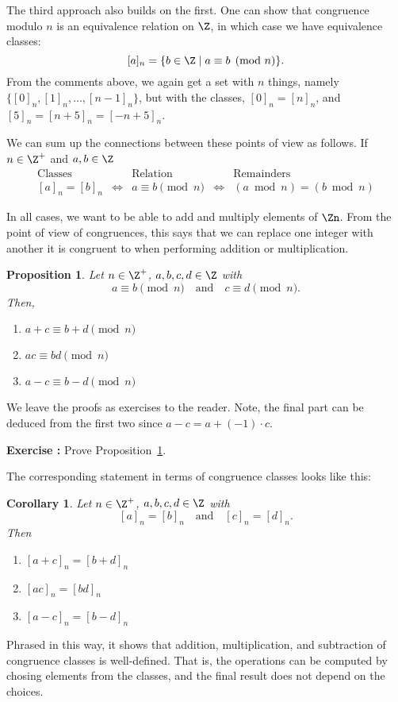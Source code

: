 \documentclass[12pt]{amsart}
\newcounter{probs}
\newenvironment{prob}{%
  \refstepcounter{probs}
  \par\medskip\noindent\textbf{Exercise \theprobs:} }{\par\medskip}
\theoremstyle{plain}
\newtheorem{prop}[thm]{Proposition}
\newtheorem{cor}[thm]{Corollary}
\theoremstyle{definition}
\theoremstyle{remark}
\begin{document}
The third approach also builds on the first.  One can show that
congruence modulo $n$ is an equivalence relation on $\Z$, in which
case we have equivalence classes:
\[ [a]_n = \{b\in\Z\mid a\equiv b\pmod n\}.\]
From the comments above, we again get a set with $n$ things, namely
$\{[0]_n, [1]_n, \ldots, [n-1]_n\}$, but with the classes, $[0]_n=[n]_n$, and
$[5]_n=[n+5]_n=[-n+5]_n$.

We can sum up the connections between these points of view as
follows.  If $n\in\Z^+$ and $a,b\in \Z$
\[
\begin{array}{ccccc}
\text{Classes} && \text{Relation} && \text{Remainders} \\[1ex]
[a]_n=[b]_n & \iff & a\equiv b\pmod n & \iff & (a\bmod n) = (b \bmod n)
\end{array}
\]

In all cases, we want to be able to add and multiply elements of
$\Zn$.  From the point of view of congruences, this says that we can
replace one integer with another it is congruent to when performing
addition or multiplication.
\begin{prop}\label{cong-well-def}
  Let $n\in\Z^+$, $a,b,c,d\in \Z$ with 
  \[ a\equiv b \pmod n \quad\text{and}\quad c\equiv d\pmod n.\]
  Then,
  \begin{enumerate}
  \item $a+c\equiv b+d\pmod n$
  \item $ac\equiv bd \pmod n$
  \item $a-c\equiv b-d\pmod n$
  \end{enumerate}
\end{prop}
We leave the proofs as exercises to the reader.  Note, the final part
can be deduced from the first two since $a-c=a+(-1)\cdot c$.
\begin{prob}
  Prove Proposition~\ref{cong-well-def}.
\end{prob}


The corresponding statement in terms of congruence classes looks like
this:
\begin{cor}
  Let $n\in\Z^+$, $a,b,c,d\in \Z$ with 
  \[ [a]_n=[b]_n  \quad\text{and}\quad [c]_n= [d]_n.\]
  Then
  \begin{enumerate}
  \item $[a+c]_n=[b+d]_n$
  \item $[ac]_n= [bd]_n$
  \item $[a-c]_n=[b-d]_n$
  \end{enumerate}
\end{cor}
Phrased in this way, it shows that addition, multiplication, and
subtraction of congruence classes is well-defined.  That is, the
operations can be computed by chosing elements from the classes, and
the final result does not depend on the choices.
\end{document}
